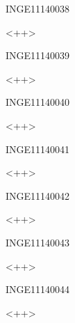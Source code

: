 \documentclass{article}
\begin{document}
\begin{corrige}{INGE11140038}

<++>

\end{corrige}%


\begin{corrige}{INGE11140039}

<++>

\end{corrige}%


\begin{corrige}{INGE11140040}

<++>

\end{corrige}%


\begin{corrige}{INGE11140041}

<++>

\end{corrige}%


\begin{corrige}{INGE11140042}

<++>

\end{corrige}%


\begin{corrige}{INGE11140043}

<++>

\end{corrige}%


\begin{corrige}{INGE11140044}

<++>

\end{corrige}%
\end{document}
